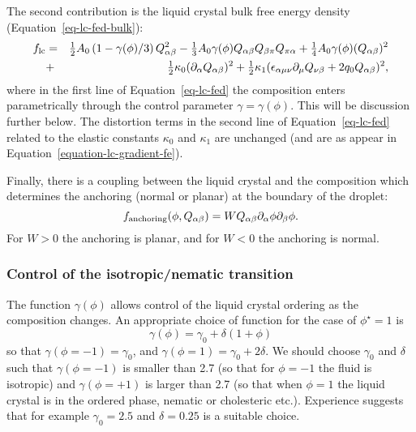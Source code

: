 The second contribution is the liquid crystal bulk free energy density
(Equation~\ref{eq-lc-fed-bulk}):
\begin{eqnarray}
f_{\rm lc} &=&
  {\textstyle\frac{1}{2}}A_0 \left(1-\gamma(\phi)/3\right) Q_{\alpha\beta}^2
- {\textstyle\frac{1}{3}}A_0 \gamma(\phi)
  Q_{\alpha\beta} Q_{\beta\pi} Q_{\pi\alpha}
+ {\textstyle\frac{1}{4}} A_0 \gamma(\phi) (Q_{\alpha\beta})^2\nonumber\\
&+&{\textstyle\frac{1}{2}} \kappa_0 (\partial_\alpha Q_{\alpha\beta})^2
+ {\textstyle\frac{1}{2}} \kappa_1
(\epsilon_{\alpha\mu\nu} \partial_\mu Q_{\nu\beta} + 2q_0 Q_{\alpha\beta})^2,
\label{eq-lc-fed}
\end{eqnarray}
where in the first line of Equation~\ref{eq-lc-fed} the composition enters parametrically through the control
parameter $\gamma = \gamma(\phi)$. This will be discussion further
below. The distortion terms in the
second line of Equation~\ref{eq-lc-fed} related to the elastic constants $\kappa_0$ and $\kappa_1$
are unchanged (and are as appear in Equation~\ref{equation-lc-gradient-fe}).

Finally, there is a coupling between the liquid crystal and the
composition which determines the anchoring (normal or planar) at
the boundary of the droplet:
\begin{equation}
f_{\rm anchoring}(\phi,Q_{\alpha\beta}) =
W Q_{\alpha\beta}\partial_{\alpha}\phi\partial_{\beta}\phi.
\end{equation}
For $W>0$ the anchoring is planar, and for $W<0$ the anchoring is normal.

\subsubsection{Control of the isotropic/nematic transition}
The function $\gamma(\phi)$ allows control of the liquid crystal
ordering as the composition changes. An appropriate choice of function
for the case of $\phi^\star = 1$ is
\begin{equation}
\gamma(\phi)=\gamma_0+\delta\left(1+\phi\right)
\end{equation}
so that $\gamma(\phi=-1)=\gamma_0$, and $\gamma(\phi=1)=\gamma_0+2\delta$.
We should choose $\gamma_0$ and $\delta$ such that $\gamma(\phi=-1)$ 
is smaller than 2.7 (so that for $\phi=-1$ the fluid is isotropic)
and $\gamma(\phi=+1)$ is larger than 2.7 (so that when $\phi=1$ the
liquid crystal is in the ordered phase, nematic or cholesteric etc.).
Experience suggests that for example 
$\gamma_0=2.5$ and $\delta=0.25$ is a suitable choice.

